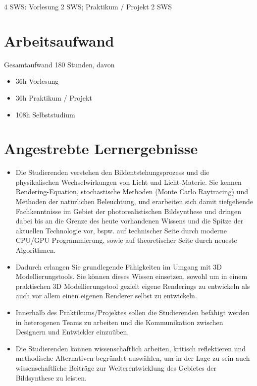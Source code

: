 4 SWS: Vorlesung 2 SWS; Praktikum / Projekt 2 SWS

\section*{Arbeitsaufwand\label{/mi-2017/modulbeschreibungen-master/MA_VC_Modul_PhotorealistischeBildsynthese}}\label{arbeitsaufwandpathlabelmi-2017modulbeschreibungen-mastermaux5fvcux5fmodulux5fphotorealistischebildsynthese}

Gesamtaufwand 180 Stunden, davon

\begin{itemize}
\tightlist
\item
  36h Vorlesung
\item
  36h Praktikum / Projekt
\item
  108h Selbststudium
\end{itemize}

\section*{Angestrebte
Lernergebnisse\label{/mi-2017/modulbeschreibungen-master/MA_VC_Modul_PhotorealistischeBildsynthese}}\label{angestrebte-lernergebnissepathlabelmi-2017modulbeschreibungen-mastermaux5fvcux5fmodulux5fphotorealistischebildsynthese}

\begin{itemize}
\tightlist
\item
  Die Studierenden verstehen den Bildentstehungsprozess und die
  physikalischen Wechselwirkungen von Licht und Licht-Materie. Sie
  kennen Rendering-Equation, stochastische Methoden (Monte Carlo
  Raytracing) und Methoden der natürlichen Beleuchtung, und erarbeiten
  sich damit tiefgehende Fachkenntnisse im Gebiet der photorealistischen
  Bildsynthese und dringen dabei bis an die Grenze des heute vorhandenen
  Wissens und die Spitze der aktuellen Technologie vor, bspw. auf
  technischer Seite durch moderne CPU/GPU Programmierung, sowie auf
  theoretischer Seite durch neueste Algorithmen.
\item
  Dadurch erlangen Sie grundlegende Fähigkeiten im Umgang mit 3D
  Modellierungstools. Sie können dieses Wissen einsetzen, sowohl um in
  einem praktischen 3D Modellierungstool gezielt eigene Renderings zu
  entwickeln als auch vor allem einen eigenen Renderer selbst zu
  entwickeln.
\item
  Innerhalb des Praktikums/Projektes sollen die Studierenden befähigt
  werden in heterogenen Teams zu arbeiten und die Kommunikation zwischen
  Designern und Entwickler einzuüben.
\item
  Die Studierenden können wissenschaftlich arbeiten, kritisch
  reflektieren und methodische Alternativen begründet auswählen, um in
  der Lage zu sein auch wissenschaftliche Beiträge zur Weiterentwicklung
  des Gebietes der Bildsynthese zu leisten.
\end{itemize}


